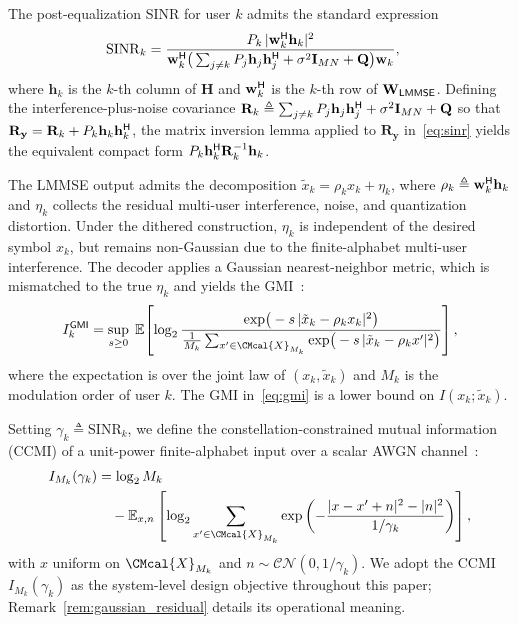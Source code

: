 \documentclass[10pt, twocolumn, comsoc]{IEEEtran}
\begin{document}
The post-equalization SINR for user $k$ admits the standard expression
\begin{align} \label{eq:sinr}
  \mathrm{SINR}_k 
  &= \frac{P_k \, |\mathbf{w}_k^{\sf H} \mathbf{h}_k|^2}
         {\mathbf{w}_k^{\sf H} \big(\sum_{j \neq k} 
            P_j \mathbf{h}_j \mathbf{h}_j^{\sf H} 
            + \sigma^2 \mathbf{I}_{MN} + \mathbf{Q}\big) 
          \mathbf{w}_k},
\end{align}
where $\mathbf{h}_k$ is the $k$-th column of $\mathbf{H}$ and $\mathbf{w}_k^{\sf H}$ is the $k$-th row of $\mathbf{W}_{\sf LMMSE}$. Defining the interference-plus-noise covariance $\mathbf{R}_k \triangleq \sum_{j \neq k} P_j \mathbf{h}_j \mathbf{h}_j^{\sf H} + \sigma^2 \mathbf{I}_{MN} + \mathbf{Q}$ so that $\mathbf{R}_{\mathbf{y}} = \mathbf{R}_k + P_k \mathbf{h}_k\mathbf{h}_k^{\sf H}$, the matrix inversion lemma applied to $\mathbf{R}_{\mathbf{y}}$ in~\eqref{eq:sinr} yields the equivalent compact form $P_k \mathbf{h}_k^{\sf H} \mathbf{R}_k^{-1} \mathbf{h}_k$.

The LMMSE output admits the decomposition $\tilde{x}_k = \rho_k x_k + \eta_k$, where $\rho_k \triangleq \mathbf{w}_k^{\sf H}\mathbf{h}_k$ and $\eta_k$ collects the residual multi-user interference, noise, and quantization distortion. Under the dithered construction, $\eta_k$ is independent of the desired symbol $x_k$, but remains non-Gaussian due to the finite-alphabet multi-user interference.
The decoder applies a Gaussian nearest-neighbor metric, which is mismatched to the true $\eta_k$ and yields the GMI~\cite{merhav1994information, ganti2000mismatched}:
\begin{align} \label{eq:gmi}
  I_k^{\sf GMI} 
  = \sup_{s \ge 0}\;
    \mathbb{E} \!\left[
      \log_2 
      \frac{\exp \!\big(-s\,|\tilde{x}_k - \rho_k x_k|^2\big)}
           {\frac{1}{M_k}\sum_{x' \in \CMcal{X}_{M_k}} 
             \exp \!\big(-s\,|\tilde{x}_k - \rho_k x'|^2\big)}
    \right],
\end{align}
where the expectation is over the joint law of $(x_k, \tilde{x}_k)$ and $M_k$ is the modulation order of user $k$. 
The GMI in~\eqref{eq:gmi} is a lower bound on $I(x_k; \tilde{x}_k)$.

Setting $\gamma_k \triangleq \mathrm{SINR}_k$, we define the constellation-constrained mutual information (CCMI) of a unit-power finite-alphabet input over a scalar AWGN channel~\cite{bruno2026mismatch}:
\begin{align} \label{eq:mi_finite_def}
  I_{M_k}(\gamma_k) 
  &= \log_2 M_k \nonumber \\
  &\quad - \mathbb{E}_{x, n}  \left[
    \log_2 \sum_{x' \in \CMcal{X}_{M_k}} 
    \exp  \left(
      -\frac{|x - x' + n|^2 - |n|^2}{1/\gamma_k}
    \right)
  \right],
\end{align}
with $x$ uniform on $\CMcal{X}_{M_k}$ and $n \sim \mathcal{CN}(0, 1/\gamma_k)$. 
We adopt the CCMI $I_{M_k}(\gamma_k)$ as the system-level design objective throughout this paper; Remark~\ref{rem:gaussian_residual} details its operational meaning.
\end{document}
